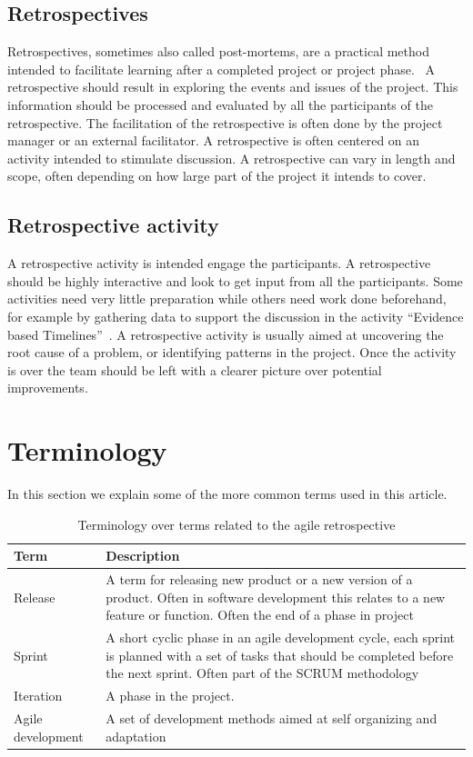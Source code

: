\documentclass[12pt]{article}
\begin{document}
\subsection{Retrospectives}
Retrospectives, sometimes also called post-mortems, are a practical method intended to facilitate learning after a completed project or project phase.~\cite{Dingsoyr2005} A retrospective should result in exploring the events and issues of the project. This information should be processed and evaluated by all the participants of the retrospective. The facilitation of the retrospective is often done by the project manager or an external facilitator. A retrospective is often centered on an activity intended to stimulate discussion. A retrospective can vary in length and scope, often depending on how large part of the project it intends to cover.

\subsection{Retrospective activity}
A retrospective activity is intended engage the participants. A retrospective should be highly interactive and look to get input from all the participants. Some activities need very little preparation while others need work done beforehand, for example by gathering data to support the discussion in the activity ``Evidence based Timelines''~\cite{Bjarnason2012}. A retrospective activity is usually aimed at uncovering the root cause of a problem, or identifying patterns in the project. Once the activity is over the team should be left with a clearer picture over potential improvements.

\section{Terminology}
In this section we explain some of the more common terms used in this article. 

\begin{table}[!h]
	\begin{center}
	\caption{Terminology over terms related to the agile retrospective}
	\label{table:terminology}
	\begin{tabular}{ l  p{}}
	\hline
	Term & Description \\
	\hline
	Release & A term for releasing  new product or a new version of a product. Often in software development this relates to a new feature or function. Often the end of a phase in project \\
	Sprint & A short cyclic phase in an agile development cycle, each sprint is planned with a set of tasks that should be completed before the next sprint. Often part of the SCRUM methodology \\
	Iteration & A phase in the project. \\
	Agile development & A set of development methods aimed at self organizing and adaptation \\
	\hline
	\end{tabular}
\end{center}
\end{table}
\end{document}
